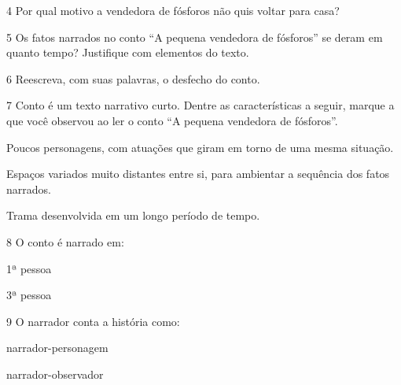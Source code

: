 \num{4} Por qual motivo a vendedora de fósforos não quis voltar para casa?


\num{5} Os fatos narrados no conto ``A pequena vendedora de fósforos'' se
deram em quanto tempo? Justifique com elementos do texto.


\num{6} Reescreva, com suas palavras, o desfecho do conto.


\num{7} Conto é um texto narrativo curto. Dentre as características a seguir,
marque a que você observou ao ler o conto ``A pequena vendedora de
fósforos''.

\begin{boxlist}
 Poucos personagens, com atuações que giram em torno de uma mesma
situação.

 Espaços variados muito distantes entre si, para ambientar a
sequência dos fatos narrados.

 Trama desenvolvida em um longo período de tempo.
\end{boxlist}

\num{8} O conto é narrado em:

\begin{boxlist}
 1ª pessoa

 3ª pessoa
\end{boxlist}

\pagebreak
\num{9} O narrador conta a história como:


\begin{boxlist}
 narrador-personagem

 narrador-observador
\end{boxlist}

